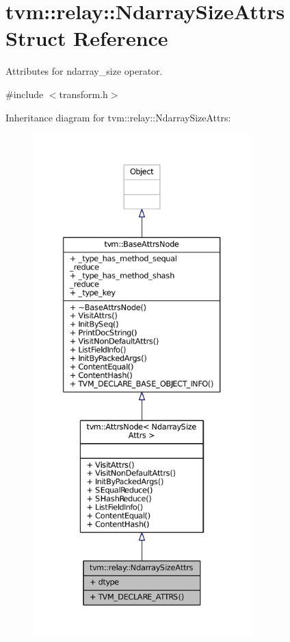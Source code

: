 \hypertarget{structtvm_1_1relay_1_1NdarraySizeAttrs}{}\section{tvm\+:\+:relay\+:\+:Ndarray\+Size\+Attrs Struct Reference}
\label{structtvm_1_1relay_1_1NdarraySizeAttrs}


Attributes for ndarray\+\_\+size operator.  




{\ttfamily \#include $<$transform.\+h$>$}



Inheritance diagram for tvm\+:\+:relay\+:\+:Ndarray\+Size\+Attrs\+:
\nopagebreak
\begin{figure}[H]
\begin{center}
\leavevmode
\includegraphics[height=550pt]{structtvm_1_1relay_1_1NdarraySizeAttrs__inherit__graph}
\end{center}
\end{figure}


